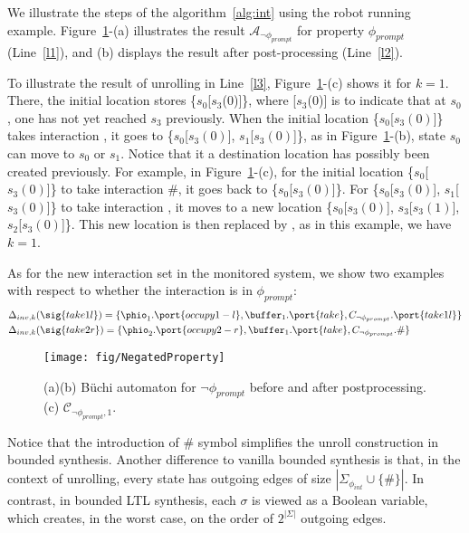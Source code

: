 \begin{example}
We illustrate the steps of the algorithm~\ref{alg:int} using the robot running example. 
Figure~\ref{fig:negated.property}-(a) illustrates the
result $\mathcal{A}_{\neg \phi_{prompt}}$ for property $\phi_{prompt}$
(Line~\ref{l1}), and  (b) displays the result after post-processing
(Line~\ref{l2})\@. 

To illustrate the result of unrolling in Line~\ref{l3},
Figure~\ref{fig:negated.property}-(c) shows it for $k=1$. There, the
initial location stores \{$s_0$[$s_3$(0)]\}, where [$s_3$(0)] is to
indicate that at $s_0$, one has not yet reached $s_3$ previously. When
the initial location \{$s_0$[$s_3(0)$]\} takes interaction
, it goes to \{$s_0$[$s_3(0)$], $s_1$[$s_3(0)$]\}, as in
Figure~\ref{fig:negated.property}-(b), state $s_0$ can move to $s_0$
or $s_1$. Notice  that it a destination location has possibly been created previously. 
For example, in
Figure~\ref{fig:negated.property}-(c), for the initial location
\{$s_0$[$s_3(0)$]\} to take interaction \#, it goes back to
\{$s_0$[$s_3(0)$]\}. For
\{$s_0$[$s_3(0)$], $s_1$[$s_3(0)$]\} to take interaction ,
it moves to a new location \{$s_0$[$s_3(0)$], $s_3$[$s_3(1)$],
$s_2$[$s_3(0)$]\}. This new location is then replaced by ,
as in this example, we have $k=1$.

As for the new interaction set in the monitored system, we show two
examples with respect to whether the interaction is in $\phi_{prompt}$:
\begin{align*}
& \Delta_{inv,k}(\sig{take1l}) = \{\phio_1.\port{occupy1-l}, \buffer_1.\port{take}, C_{\neg\phi_{prompt}}.\port{take1l}\}\\
& \Delta_{inv,k}(\sig{take2r}) = \{\phio_2.\port{occupy2-r}, \buffer_1.\port{take}, C_{\neg \phi_{prompt}}.\#\}
\end{align*}

\end{example}	

\begin{figure}[htp]
\centering
\texttt{[image: fig/NegatedProperty]}
\caption{(a)(b) B\"uchi automaton for $\neg \phi_{prompt}$ before and
  after postprocessing. (c) 
$\mathcal{C}_{\neg \phi_{prompt}, 1}$.
}
\label{fig:negated.property}
\end{figure}
Notice that the introduction of $\#$ symbol simplifies the unroll construction in bounded synthesis. 
Another difference to vanilla bounded synthesis is that, in the context of unrolling, every state
has outgoing edges of size $|\Sigma_{\phi_{int}}\cup \{\#\}|$. 
In contrast, in  bounded LTL synthesis, each $\sigma$ is viewed as a Boolean
variable, which creates, in the worst case, on the order of $2^{|\Sigma|}$ outgoing edges.

